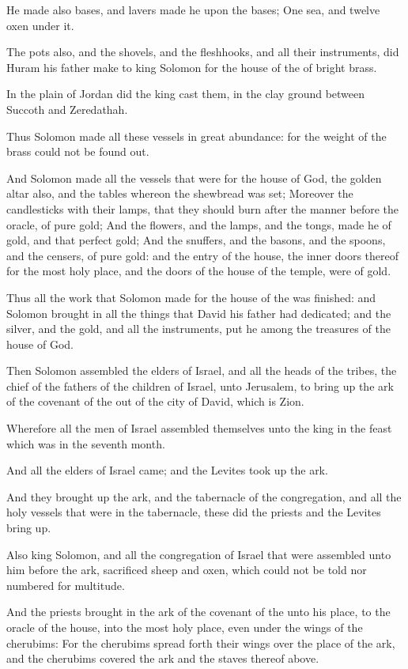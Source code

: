 \Verse He made also bases, and lavers made he upon the bases; \Verse One sea, and twelve oxen under it.

\Verse The pots also, and the shovels, and the fleshhooks, and all their instruments, did Huram his father make to king Solomon for the house of the \LORD of bright brass.

\Verse In the plain of Jordan did the king cast them, in the clay ground between Succoth and Zeredathah.

\Verse Thus Solomon made all these vessels in great abundance: for the weight of the brass could not be found out.

\Verse And Solomon made all the vessels that were for the house of God, the golden altar also, and the tables whereon the shewbread was set; \Verse Moreover the candlesticks with their lamps, that they should burn after the manner before the oracle, of pure gold; \Verse And the flowers, and the lamps, and the tongs, made he of gold, and that perfect gold; \Verse And the snuffers, and the basons, and the spoons, and the censers, of pure gold: and the entry of the house, the inner doors thereof for the most holy place, and the doors of the house of the temple, were of gold.


\Chapter
\Verse Thus all the work that Solomon made for the house of the \LORD was finished: and Solomon brought in all the things that David his father had dedicated; and the silver, and the gold, and all the instruments, put he among the treasures of the house of God.

\Verse Then Solomon assembled the elders of Israel, and all the heads of the tribes, the chief of the fathers of the children of Israel, unto Jerusalem, to bring up the ark of the covenant of the \LORD out of the city of David, which is Zion.

\Verse Wherefore all the men of Israel assembled themselves unto the king in the feast which was in the seventh month.

\Verse And all the elders of Israel came; and the Levites took up the ark.

\Verse And they brought up the ark, and the tabernacle of the congregation, and all the holy vessels that were in the tabernacle, these did the priests and the Levites bring up.

\Verse Also king Solomon, and all the congregation of Israel that were assembled unto him before the ark, sacrificed sheep and oxen, which could not be told nor numbered for multitude.

\Verse And the priests brought in the ark of the covenant of the \LORD unto his place, to the oracle of the house, into the most holy place, even under the wings of the cherubims: \Verse For the cherubims spread forth their wings over the place of the ark, and the cherubims covered the ark and the staves thereof above.

